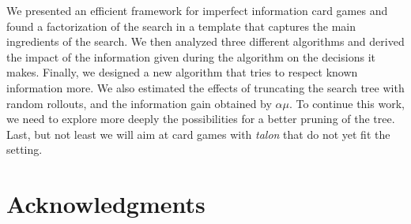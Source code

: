 \documentclass[runningheads]{llncs}
\begin{document}
We presented an efficient framework for imperfect information card games and found a factorization of the search in a template that captures the main ingredients of the search. We then analyzed three different algorithms and derived the impact of the information given during the algorithm on the decisions it makes. Finally, we designed a new algorithm that tries to respect known information more. We also estimated the effects of truncating the search tree with random rollouts, and the information gain obtained by $\alpha\mu$.
% 
To continue this work, we need to explore more deeply the possibilities for a better pruning of the tree. 
Last, but not least we will aim at card games with \emph{talon} 
that do not yet fit the setting.


\section{Acknowledgments}
\end{document}
